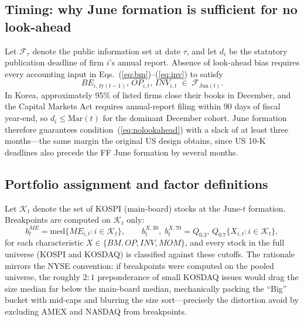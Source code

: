 \documentclass[11pt]{article}
\begin{document}
\subsection{Timing: why June formation is sufficient for no look-ahead}

Let $\mathcal{F}_\tau$ denote the public information set at date $\tau$, and let $d_i$ be the statutory publication deadline of firm $i$'s annual report. Absence of look-ahead bias requires every accounting input in Eqs.~(\ref{eq:bm})--(\ref{eq:inv}) to satisfy
\begin{equation}
BE_{i,\,\mathrm{fy}(t-1)},\, OP_{i,t},\, INV_{i,t} \;\in\; \mathcal{F}_{\mathrm{Jun}(t)}.
\label{eq:nolookahead}
\end{equation}
In Korea, approximately 95\% of listed firms close their books in December, and the Capital Markets Act requires annual-report filing within 90 days of fiscal year-end, so $d_i \le \mathrm{Mar}(t)$ for the dominant December cohort. June formation therefore guarantees condition~(\ref{eq:nolookahead}) with a slack of at least three months---the same margin the original US design obtains, since US 10-K deadlines also precede the FF June formation by several months.

\subsection{Portfolio assignment and factor definitions}

Let $\mathcal{K}_t$ denote the set of KOSPI (main-board) stocks at the June-$t$ formation. Breakpoints are computed on $\mathcal{K}_t$ only:
\begin{equation}
b^{ME}_t = \mathrm{med}\{ME_{i,t}: i \in \mathcal{K}_t\}, \qquad
b^{X,30}_t,\; b^{X,70}_t = Q_{0.3},\, Q_{0.7}\{X_{i,t}: i \in \mathcal{K}_t\},
\label{eq:breakpoints}
\end{equation}
for each characteristic $X \in \{BM, OP, INV, MOM\}$, and every stock in the full universe (KOSPI and KOSDAQ) is classified against these cutoffs. The rationale mirrors the NYSE convention: if breakpoints were computed on the pooled universe, the roughly $2{:}1$ preponderance of small KOSDAQ issues would drag the size median far below the main-board median, mechanically packing the ``Big'' bucket with mid-caps and blurring the size sort---precisely the distortion \citet{fama1993} avoid by excluding AMEX and NASDAQ from breakpoints.
\end{document}
